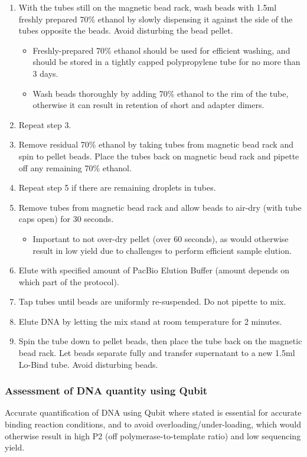 \begin{enumerate}
\begin{itemize}
	\end{itemize}
	\item With the tubes still on the magnetic bead rack, wash beads with 1.5ml freshly prepared 70\% ethanol by slowly dispensing it against the side of the tubes opposite the beads. Avoid disturbing the bead pellet.
	\begin{itemize}
		\item Freshly-prepared 70\% ethanol should be used for efficient washing, and should be stored in a tightly capped polypropylene tube for no more than 3 days.
		\item Wash beads thoroughly by adding 70\% ethanol to the rim of the tube, otherwise it can result in retention of short and adapter dimers.
	\end{itemize} 	
	\item Repeat step 3. 
	\item Remove residual 70\% ethanol by taking tubes from magnetic bead rack and spin to pellet beads. Place the tubes back on magnetic bead rack and pipette off any remaining 70\% ethanol.
	\item Repeat step 5 if there are remaining droplets in tubes. 
	\item Remove tubes from magnetic bead rack and allow beads to air-dry (with tube caps open) for 30 seconds.
	\begin{itemize}
		\item Important to not over-dry pellet (over 60 seconds), as would otherwise result in low yield due to challenges to perform efficient sample elution. 
	\end{itemize}
	\item Elute with specified amount of PacBio Elution Buffer (amount depends on which part of the protocol).
	\item Tap tubes until beads are uniformly re-suspended. Do not pipette to mix.
	\item Elute DNA by letting the mix stand at room temperature for 2 minutes.
	\item Spin the tube down to pellet beads, then place the tube back on the magnetic bead rack. Let beads separate fully and transfer supernatant to a new 1.5ml Lo-Bind tube. Avoid disturbing beads. 
\end{enumerate}


\subsubsection{Assessment of DNA quantity using Qubit}
Accurate quantification of DNA using Qubit where stated is essential for accurate binding reaction conditions, and to avoid overloading/under-loading, which would otherwise result in high P2 (off polymerase-to-template ratio) and low sequencing yield. 

